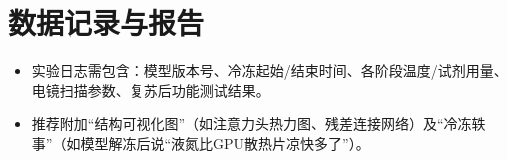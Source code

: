 \section{数据记录与报告}
\begin{itemize}
\item 实验日志需包含：模型版本号、冷冻起始/结束时间、各阶段温度/试剂用量、电镜扫描参数、复苏后功能测试结果。
\item 推荐附加“结构可视化图”（如注意力头热力图、残差连接网络）及“冷冻轶事”（如模型解冻后说“液氮比GPU散热片凉快多了”）。
\end{itemize}
